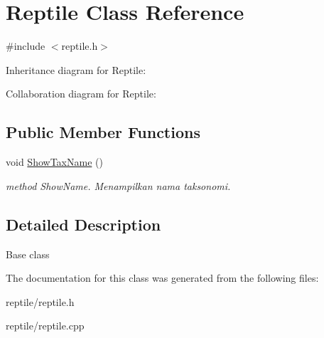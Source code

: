 \hypertarget{classReptile}{}\section{Reptile Class Reference}
\label{classReptile}


{\ttfamily \#include $<$reptile.\+h$>$}



Inheritance diagram for Reptile\+:


Collaboration diagram for Reptile\+:
\subsection*{Public Member Functions}
\begin{DoxyCompactItemize}
\item 
void \hyperlink{classReptile_a4ca008392f1818081052313071d87a8a}{Show\+Tax\+Name} ()\hypertarget{classReptile_a4ca008392f1818081052313071d87a8a}{}\label{classReptile_a4ca008392f1818081052313071d87a8a}

\begin{DoxyCompactList}\small\item\em method Show\+Name. Menampilkan nama taksonomi. \end{DoxyCompactList}\end{DoxyCompactItemize}


\subsection{Detailed Description}
Base class 

The documentation for this class was generated from the following files\+:\begin{DoxyCompactItemize}
\item 
reptile/reptile.\+h\item 
reptile/reptile.\+cpp\end{DoxyCompactItemize}

